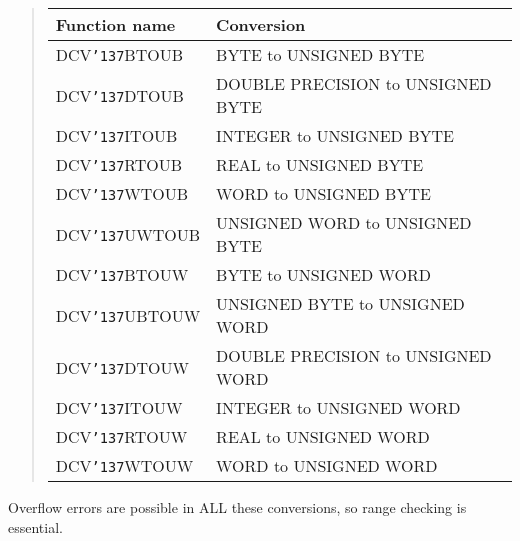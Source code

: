 \documentclass[twoside,11pt]{article}
\renewcommand{\_}{{\tt\char'137}}     %
\begin{document}
\begin{quote}
\begin{tabular}{ll}
{\bf Function name}     &{\bf Conversion}\\
\hline
DCV\_BTOUB  &BYTE to UNSIGNED BYTE \\
DCV\_DTOUB  &DOUBLE PRECISION to UNSIGNED BYTE \\
DCV\_ITOUB  &INTEGER to UNSIGNED BYTE \\
DCV\_RTOUB  &REAL to UNSIGNED BYTE \\
DCV\_WTOUB  &WORD to UNSIGNED BYTE \\
DCV\_UWTOUB &UNSIGNED WORD to UNSIGNED BYTE \\
DCV\_BTOUW  &BYTE to UNSIGNED WORD \\
DCV\_UBTOUW &UNSIGNED BYTE to UNSIGNED WORD \\
DCV\_DTOUW  &DOUBLE PRECISION to UNSIGNED WORD \\
DCV\_ITOUW  &INTEGER to UNSIGNED WORD \\
DCV\_RTOUW  &REAL to UNSIGNED WORD \\
DCV\_WTOUW  &WORD to UNSIGNED WORD \\
\end{tabular}
\end{quote}

Overflow errors are possible in ALL these conversions, so range checking is
essential.
\end{document}
